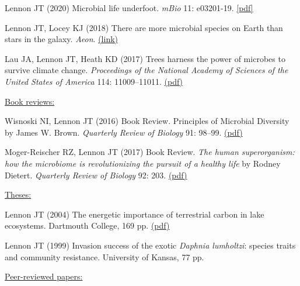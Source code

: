 \documentclass[11pt]{article}
\begin{document}
\begin{etaremune}
\item Lennon JT (2020) Microbial life underfoot. \textit{mBio} 11: e03201-19. \href{https://lennonlab.github.io/assets/publications/Lennon_2020.pdf}{[pdf]}

\item Lennon JT, Locey KJ (2018) There are more microbial species on Earth than stars in the galaxy. \textit{Aeon}. \href{https://aeon.co/ideas/there-are-more-microbial-species-on-earth-than-stars-in-the-sky}{(link)}

\item Lau JA, Lennon JT, Heath KD (2017) Trees harness the power of microbes to survive climate change. \textit{Proceedings of the National Academy of Sciences of the United States of America} 114: 11009–11011. \href{https://lennonlab.github.io/assets/publications/Lau_etal_2017.pdf}{(pdf)}

\vspace{1em}
\item[] \textnormal{\underline{Book reviews:}}

\item Wisnoski NI, Lennon JT (2016) Book Review. Principles of Microbial Diversity by James W. Brown. \textit{Quarterly Review of Biology} 91: 98–99. \href{https://lennonlab.github.io/assets/publications/Wisnoski_Lennon_2016.pdf}{(pdf)}

\item Moger-Reischer RZ, Lennon JT (2017) Book Review. \textit{The human superorganism: how the microbiome is revolutionizing the pursuit of a healthy life} by Rodney Dietert. \textit{Quarterly Review of Biology} 92: 203. \href{https://lennonlab.github.io/assets/publications/Moger-Reicher_Lennon_2017.pdf}{(pdf)}

\vspace{1em}
\item[] \textnormal{\underline{Theses:}}

\item Lennon JT (2004) The energetic importance of terrestrial carbon in lake ecosystems. Dartmouth College, 169 pp. \href{https://lennonlab.github.io/assets/publications/Lennon_2004_Thesis.pdf}{(pdf)}

\item Lennon JT (1999) Invasion success of the exotic \textit{Daphnia lumholtzi}: species traits and community resistance. University of Kansas, 77 pp.


\vspace{1em}
\item[] \textnormal{\underline{Peer-reviewed papers:}}


\end{etaremune}
\end{document}
